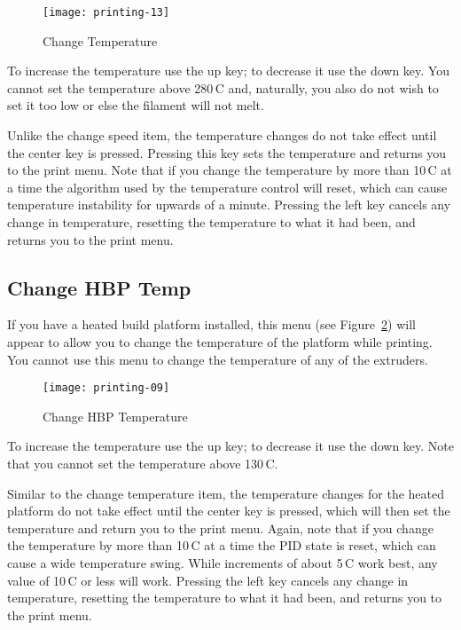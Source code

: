 \begin{figure}[!htbp]
  \centering
    \texttt{[image: printing-13]}
    \caption{Change Temperature}
  \label{fig:printtemp}
\end{figure}

To increase the temperature use the up key; to decrease it use the down key.  You cannot set the temperature above 280\textdegree\,C and, naturally, you also do not wish to set it too low or else the filament will not melt.

Unlike the change speed item, the temperature changes do not take effect until the center key is pressed.  Pressing this key sets the temperature and returns you to the print menu.  Note that if you change the temperature by more than 10\textdegree\,C at a time the algorithm used by the temperature control will reset, which can cause temperature instability for upwards of a minute.  Pressing the left key cancels any change in temperature, resetting the temperature to what it had been, and returns you to the print menu.


\subsection{Change HBP Temp}\label{sec:hbp-temp}

If you have a heated build platform installed, this menu (see Figure~\ref{fig:printhbptemp})  will appear to allow you to change the temperature of the platform while printing. You cannot use this menu to change the temperature of any of the extruders.

\begin{figure}[!htbp]
  \centering
    \texttt{[image: printing-09]}
    \caption{Change HBP Temperature}
  \label{fig:printhbptemp}
\end{figure}

To increase the temperature use the up key; to decrease it use the down key.  Note that you cannot set the temperature above 130\textdegree\,C.

Similar to the change temperature item, the temperature changes for the heated platform do not take effect until the center key is pressed, which will then set the temperature and return you to the print menu.  Again, note that if you change the temperature by more than 10\textdegree\,C at a time the PID state is reset, which can cause a wide temperature swing.  While increments of about 5\textdegree\,C work best, any value of 10\textdegree\,C or less will work. Pressing the left key cancels any change in temperature, resetting the temperature to what it had been, and returns you to the print menu.

